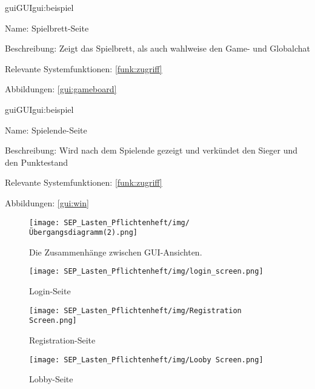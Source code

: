 \begin{description}[leftmargin=5em, style=sameline]	
	\begin{lhp}{gui}{GUI}{gui:beispiel}
		\item[Name:] Spielbrett-Seite
		\item[Beschreibung:] Zeigt das Spielbrett, als auch wahlweise den Game- und Globalchat
		\item[Relevante Systemfunktionen:] \ref{funk:zugriff}
		\item[Abbildungen:] \ref{gui:gameboard}
	\end{lhp}
\end{description}

\begin{description}[leftmargin=5em, style=sameline]	
	\begin{lhp}{gui}{GUI}{gui:beispiel}
		\item[Name:] Spielende-Seite
		\item[Beschreibung:] Wird nach dem Spielende gezeigt und verkündet den Sieger und den Punktestand 
		\item[Relevante Systemfunktionen:] \ref{funk:zugriff}
		\item[Abbildungen:] \ref{gui:win}
	\end{lhp}
\end{description}

\begin{figure}[!h]
	\centering
	\texttt{[image: SEP\_Lasten\_Pflichtenheft/img/Übergangsdiagramm(2).png]}
	\caption{Die Zusammenhänge zwischen GUI-Ansichten.}
	\label{gui:zusammenhang}
\end{figure}

\begin{figure}[!h]
	\centering
	\texttt{[image: SEP\_Lasten\_Pflichtenheft/img/login\_screen.png]}
	\caption{Login-Seite}
	\label{gui:login}
\end{figure}

\begin{figure}[!h]
	\centering
	\texttt{[image: SEP\_Lasten\_Pflichtenheft/img/Registration Screen.png]}
	\caption{Registration-Seite}
	\label{gui:registration}
\end{figure}

\begin{figure}[!h]
	\centering
	\texttt{[image: SEP\_Lasten\_Pflichtenheft/img/Looby Screen.png]}
	\caption{Lobby-Seite}
	\label{gui:lobby}
\end{figure}

